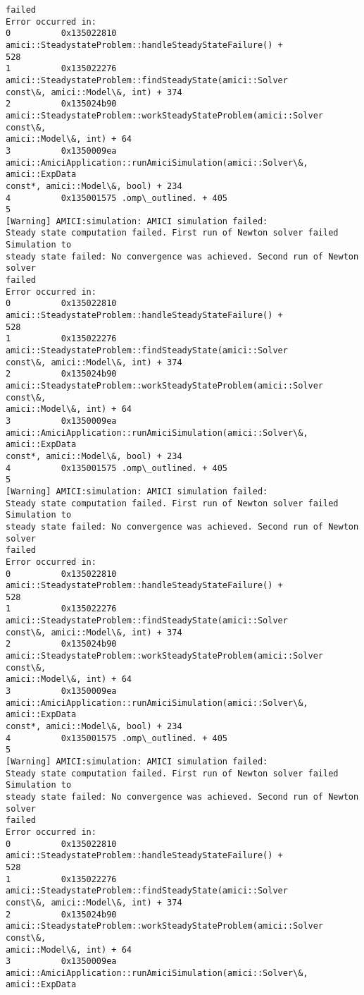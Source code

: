 \documentclass[11pt]{article}
\begin{document}
\begin{Verbatim}[commandchars=\\\{\}]
failed
Error occurred in:
0          0x135022810 amici::SteadystateProblem::handleSteadyStateFailure() +
528
1          0x135022276 amici::SteadystateProblem::findSteadyState(amici::Solver
const\&, amici::Model\&, int) + 374
2          0x135024b90
amici::SteadystateProblem::workSteadyStateProblem(amici::Solver const\&,
amici::Model\&, int) + 64
3          0x1350009ea
amici::AmiciApplication::runAmiciSimulation(amici::Solver\&, amici::ExpData
const*, amici::Model\&, bool) + 234
4          0x135001575 .omp\_outlined. + 405
5
[Warning] AMICI:simulation: AMICI simulation failed:
Steady state computation failed. First run of Newton solver failed Simulation to
steady state failed: No convergence was achieved. Second run of Newton solver
failed
Error occurred in:
0          0x135022810 amici::SteadystateProblem::handleSteadyStateFailure() +
528
1          0x135022276 amici::SteadystateProblem::findSteadyState(amici::Solver
const\&, amici::Model\&, int) + 374
2          0x135024b90
amici::SteadystateProblem::workSteadyStateProblem(amici::Solver const\&,
amici::Model\&, int) + 64
3          0x1350009ea
amici::AmiciApplication::runAmiciSimulation(amici::Solver\&, amici::ExpData
const*, amici::Model\&, bool) + 234
4          0x135001575 .omp\_outlined. + 405
5
[Warning] AMICI:simulation: AMICI simulation failed:
Steady state computation failed. First run of Newton solver failed Simulation to
steady state failed: No convergence was achieved. Second run of Newton solver
failed
Error occurred in:
0          0x135022810 amici::SteadystateProblem::handleSteadyStateFailure() +
528
1          0x135022276 amici::SteadystateProblem::findSteadyState(amici::Solver
const\&, amici::Model\&, int) + 374
2          0x135024b90
amici::SteadystateProblem::workSteadyStateProblem(amici::Solver const\&,
amici::Model\&, int) + 64
3          0x1350009ea
amici::AmiciApplication::runAmiciSimulation(amici::Solver\&, amici::ExpData
const*, amici::Model\&, bool) + 234
4          0x135001575 .omp\_outlined. + 405
5
[Warning] AMICI:simulation: AMICI simulation failed:
Steady state computation failed. First run of Newton solver failed Simulation to
steady state failed: No convergence was achieved. Second run of Newton solver
failed
Error occurred in:
0          0x135022810 amici::SteadystateProblem::handleSteadyStateFailure() +
528
1          0x135022276 amici::SteadystateProblem::findSteadyState(amici::Solver
const\&, amici::Model\&, int) + 374
2          0x135024b90
amici::SteadystateProblem::workSteadyStateProblem(amici::Solver const\&,
amici::Model\&, int) + 64
3          0x1350009ea
amici::AmiciApplication::runAmiciSimulation(amici::Solver\&, amici::ExpData

\end{Verbatim}
\end{document}
